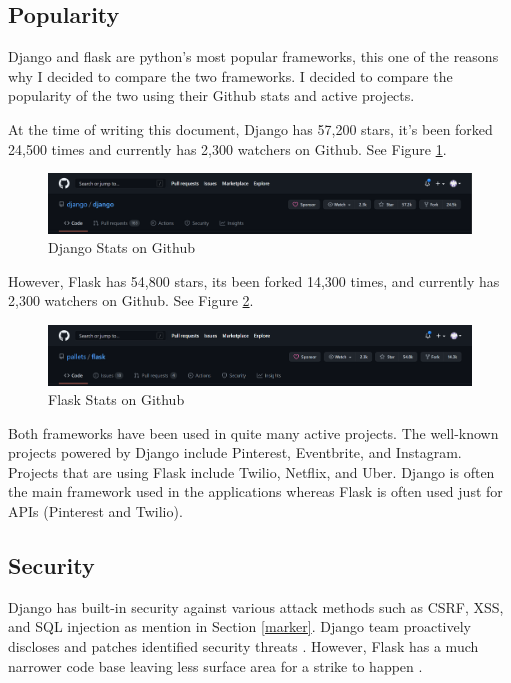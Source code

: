 \subsection{Popularity}
Django and flask are python's most popular frameworks, this one of the reasons why I decided to compare the two frameworks. I decided to compare the popularity of the two using their Github stats and active projects. 

At the time of writing this document, Django has 57,200 stars, it's been forked 24,500 times and currently has 2,300 watchers on Github. See Figure \ref{DjangoStats}.

\begin{figure}[h]
\centering
\includegraphics[scale=0.4]{img/djangoStats.PNG}
\caption{Django Stats on Github}
\label{DjangoStats}
\end{figure}

However, Flask has 54,800 stars, its been forked 14,300 times, and currently has 2,300 watchers on Github. See Figure \ref{FlaskStats}.

\begin{figure}[h]
\centering
\includegraphics[scale=0.4]{img/flaskStats.PNG}
\caption{Flask Stats on Github}
\label{FlaskStats}
\end{figure}

Both frameworks have been used in quite many active projects. The well-known projects powered by Django include Pinterest, Eventbrite, and Instagram. Projects that are using Flask include Twilio, Netflix, and Uber. Django is often the main framework used in the applications whereas Flask is often used just for APIs (Pinterest and Twilio).

\subsection{Security}
Django has built-in security against various attack methods such as CSRF, XSS, and SQL injection as mention in Section \ref{marker}. Django team proactively discloses and patches identified security threats \cite{FlaskVDjango}. However, Flask has a much narrower code base leaving less surface area for a strike to happen \cite{FlaskVDjango}. 

